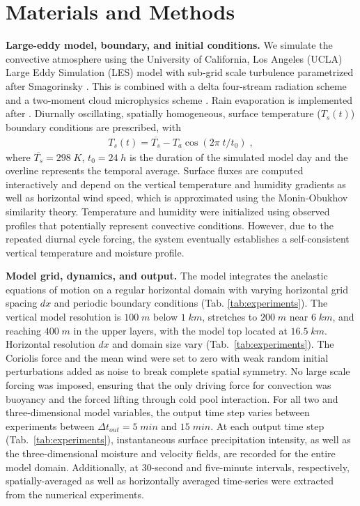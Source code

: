 \documentclass[draft,linenumbers]{agujournal2019}
\begin{document}
\section*{Materials and Methods}\label{sec:methods}
\noindent
{\bf Large-eddy model, boundary, and initial conditions.}
We simulate the convective atmosphere using the University of California, Los Angeles (UCLA) Large Eddy Simulation (LES) model with sub-grid scale turbulence parametrized after Smagorinsky \cite{smagorinsky1963general}.
This is combined with a delta four-stream radiation scheme \cite{pincus2009monte} and a two-moment cloud microphysics scheme \cite{stevens2005evaluation}. 
Rain evaporation is implemented after \citeauthor{seifert2006two} \citeyear{seifert2006two}.
Diurnally oscillating, spatially homogeneous, surface temperature ($T_s(t)$) boundary conditions are prescribed, with
\begin{eqnarray}
    T_s(t)=\overline{T_{s}}-T_{a} \cos{(2\pi\;t/t_0)}\;,
\end{eqnarray}
\noindent
where $\overline{T_{s}}=298\;K$, $t_0=24\;h$ is the duration of the simulated model day and the overline represents the temporal average.
Surface fluxes are computed interactively and depend on the vertical temperature and humidity gradients as well as horizontal wind speed, which is approximated using the Monin-Obukhov similarity theory.
Temperature and humidity were initialized using observed profiles that potentially represent convective conditions.
However, due to the repeated diurnal cycle forcing, the system eventually establishes a self-consistent vertical temperature and moisture profile.

\noindent
{\bf Model grid, dynamics, and output.}
The model integrates the anelastic equations of motion on a regular horizontal domain with varying horizontal grid spacing $dx$ and periodic boundary conditions (Tab. \ref{tab:experiments}). 
The vertical model resolution is $100\;m$ below $1\;km$, stretches to $200\;m$ near $6\;km$, and reaching $400\;m$ in the upper layers, with the model top located at $16.5\;km$.
Horizontal resolution $dx$ and domain size vary (Tab.~\ref{tab:experiments}). 
The Coriolis force and the mean wind were set to zero with weak random initial perturbations added as noise to break complete spatial symmetry. 
No large scale forcing was imposed, ensuring that the only driving force for convection was buoyancy and the forced lifting through cold pool interaction.
For all two and three-dimensional model variables, the output time step varies between experiments between $\Delta t_{out}=5\;min$ and $15\;min$. 
At each output time step (Tab.~\ref{tab:experiments}), instantaneous surface precipitation intensity, as well as the three-dimensional moisture and velocity fields, are recorded for the entire model domain. 
Additionally, at 30-second and five-minute intervals, respectively, spatially-averaged as well as horizontally averaged time-series were extracted from the numerical experiments.
\end{document}
